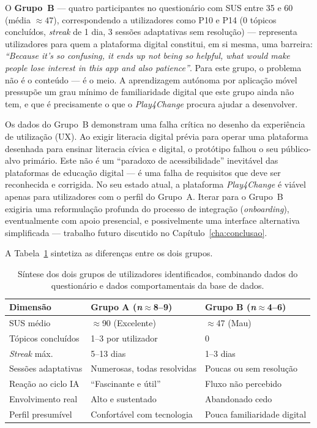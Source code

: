 O \textbf{Grupo~B} --- quatro participantes no questionário com SUS entre 35 e 60 (média $\approx 47$), correspondendo a utilizadores como P10 e P14 (0 tópicos concluídos, \emph{streak} de 1 dia, 3 sessões adaptativas sem resolução) --- representa utilizadores para quem a plataforma digital constitui, em si mesma, uma barreira: \emph{``Because it's so confusing, it ends up not being so helpful, what would make people lose interest in this app and also patience''}. Para este grupo, o problema não é o conteúdo --- é o meio. A aprendizagem autónoma por aplicação móvel pressupõe um grau mínimo de familiaridade digital que este grupo ainda não tem, e que é precisamente o que o \emph{Play4Change} procura ajudar a desenvolver.

Os dados do Grupo~B demonstram uma falha crítica no desenho da experiência de utilização (UX). Ao exigir literacia digital prévia para operar uma plataforma desenhada para ensinar literacia cívica e digital, o protótipo falhou o seu público-alvo primário. Este não é um ``paradoxo de acessibilidade'' inevitável das plataformas de educação digital --- é uma falha de requisitos que deve ser reconhecida e corrigida. No seu estado atual, a plataforma \emph{Play4Change} é viável apenas para utilizadores com o perfil do Grupo~A. Iterar para o Grupo~B exigiria uma reformulação profunda do processo de integração (\emph{onboarding}), eventualmente com apoio presencial, e possivelmente uma interface alternativa simplificada --- trabalho futuro discutido no Capítulo~\ref{cha:conclusao}.

A Tabela~\ref{tab:dois-grupos} sintetiza as diferenças entre os dois grupos.

\begin{table}[h]
	\centering
	\small
	\begin{tabular}{p{4cm} p{4cm} p{4cm}}
		\toprule
		\textbf{Dimensão} & \textbf{Grupo A} (\emph{n}$\approx$8--9) & \textbf{Grupo B} (\emph{n}$\approx$4--6) \\
		\midrule
		SUS médio           & $\approx$90 (Excelente)        & $\approx$47 (Mau) \\
		Tópicos concluídos  & 1--3 por utilizador            & 0 \\
		\emph{Streak} máx.  & 5--13 dias                     & 1--3 dias \\
		Sessões adaptativas & Numerosas, todas resolvidas    & Poucas ou sem resolução \\
		Reação ao ciclo IA & ``Fascinante e útil''          & Fluxo não percebido \\
		Envolvimento real   & Alto e sustentado              & Abandonado cedo \\
		Perfil presumível   & Confortável com tecnologia     & Pouca familiaridade digital \\
		\bottomrule
	\end{tabular}
	\caption[Comparação dos dois grupos de utilizadores identificados]{Síntese dos dois grupos de utilizadores identificados, combinando dados do questionário e dados comportamentais da base de dados.}
	\label{tab:dois-grupos}
\end{table}

